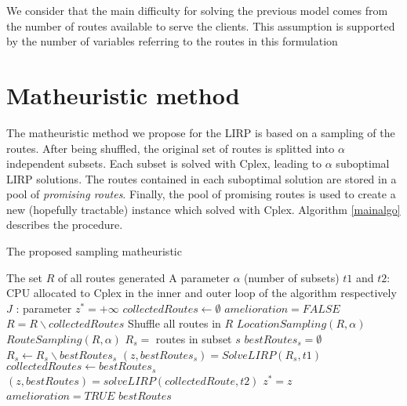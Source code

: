 \documentclass[a4paper,10pt]{article}
\begin{document}
\begin{linenumbers}
We consider that the main difficulty for solving the previous model comes from the number of routes available to serve the clients. 
This assumption is supported by the number of variables referring to the routes in this formulation
\section{Matheuristic method} 
\label{sec:algo}

The matheuristic method we propose for the LIRP is based on a sampling of the routes. 
After being shuffled, the original set of routes is splitted into $\alpha$ independent subsets. 
Each subset is solved with Cplex, leading to $\alpha$ suboptimal LIRP solutions.  
The routes contained in each suboptimal solution are stored in a pool of \textit{promising routes}. 
Finally, the pool of promising routes is used to create a new (hopefully tractable) instance which solved with Cplex. 
Algorithm \ref{mainalgo} describes the procedure.


\begin{algorithm}
	\caption{The proposed sampling matheuristic}
	\label{mainalgo}
	\begin{algorithmic}[1]
		\REQUIRE  The set $R$ of all routes generated
		\REQUIRE A parameter $\alpha$ (number of subsets)
		\REQUIRE $t1$ and $t2$: CPU allocated to Cplex in the inner and outer loop of the algorithm respectively
		\REQUIRE $J$ : parameter
		\STATE $z^*= +\infty$
		\STATE $collectedRoutes \leftarrow \emptyset$
		\REPEAT
			\STATE $amelioration = FALSE$
			\STATE $R =  R \backslash collectedRoutes$
			\STATE Shuffle all routes in $R$
			\STATE $LocationSampling(R,\alpha)$ 
			\STATE $RouteSampling(R,\alpha)$	
				\STATE $R_s = $ routes in subset $s$
				\STATE $bestRoutes_s = \emptyset$
					\STATE $R_s \leftarrow R_s \backslash bestRoutes_s$ 
					\STATE $(z,bestRoutes_s) = SolveLIRP(R_s,t1)$ 
					\STATE $collectedRoutes \leftarrow bestRoutes_s$
				\ENDFOR
			\ENDFOR
			\STATE 	$(z,bestRoutes) = solveLIRP(collectedRoute, t2)$
				\STATE $z^*=z$
				\STATE $amelioration =TRUE$
			\ENDIF
		\RETURN $bestRoutes$
	\end{algorithmic}
\end{algorithm}



\end{linenumbers}
\end{document}
